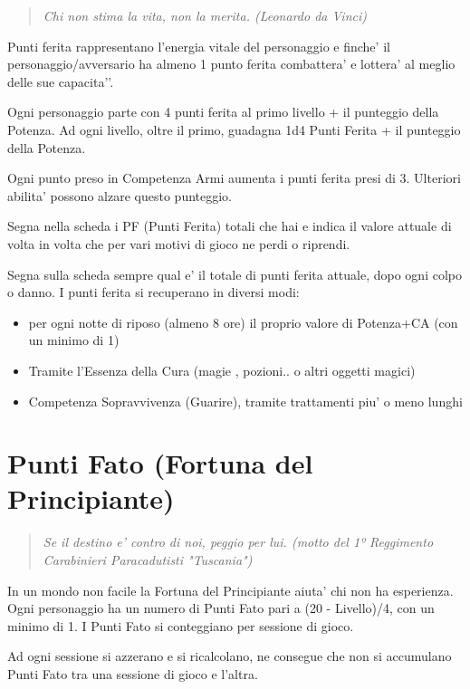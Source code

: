 \documentclass[a4paper,11pt,twoside,openany]{book}
\begin{document}
\begin{quote}\textit{Chi non stima la vita, non la merita. (Leonardo da Vinci)
}\end{quote}


Punti ferita rappresentano l’energia vitale del personaggio e finche’ il personaggio/avversario ha almeno 1 punto ferita combattera’ e lottera’ al meglio delle sue capacita'’.

Ogni personaggio parte con 4 punti ferita al primo livello + il punteggio della Potenza.
Ad ogni livello, oltre il primo, guadagna 1d4 Punti Ferita + il punteggio della Potenza. 

Ogni punto preso in Competenza Armi aumenta i punti ferita presi di 3. Ulteriori abilita’ possono alzare questo punteggio.

Segna nella scheda i PF (Punti Ferita) totali che hai e indica il valore attuale di volta in volta che per vari motivi di gioco ne perdi o riprendi.

Segna sulla scheda sempre qual e’ il totale di punti ferita attuale, dopo ogni colpo o danno.
I punti ferita si recuperano in diversi modi:

\begin{itemize}
\item 
per ogni notte di riposo (almeno 8 ore) il proprio valore di Potenza+CA (con un minimo di 1) 
\item
 Tramite l'Essenza della Cura (magie , pozioni.. o altri oggetti magici) 
\item 
Competenza Sopravvivenza (Guarire), tramite trattamenti piu' o meno lunghi 
\end{itemize}


\section{Punti Fato (Fortuna del Principiante)}
\begin{quote}\textit{Se il destino e' contro di noi, peggio per lui. (motto del 1º Reggimento Carabinieri Paracadutisti "Tuscania")
}\end{quote}

In un mondo non facile la Fortuna del Principiante aiuta’ chi non ha esperienza.
Ogni personaggio ha un numero di Punti Fato pari a (20 - Livello)/4, con un minimo di 1. I Punti Fato si conteggiano per sessione di gioco. 

Ad ogni sessione si azzerano e si ricalcolano, ne consegue che non si accumulano Punti Fato tra una sessione di gioco e l’altra.
\end{document}

